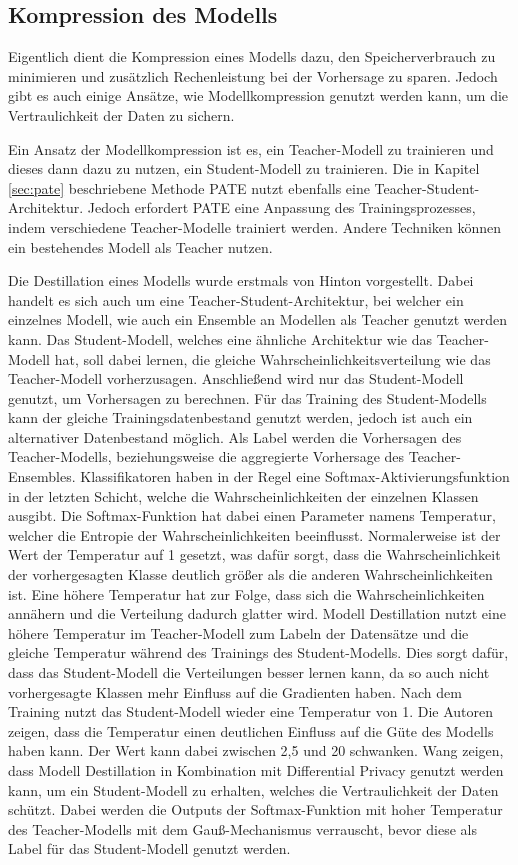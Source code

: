 \subsection{Kompression des Modells}\label{sec:kompression}

Eigentlich dient die Kompression eines Modells dazu, den Speicherverbrauch zu minimieren und zusätzlich Rechenleistung bei der Vorhersage zu sparen.
Jedoch gibt es auch einige Ansätze, wie Modellkompression genutzt werden kann, um die Vertraulichkeit der Daten zu sichern.

Ein Ansatz der Modellkompression ist es, ein Teacher-Modell zu trainieren und dieses dann dazu zu nutzen, ein Student-Modell zu trainieren. 
Die in Kapitel \ref{sec:pate} beschriebene Methode PATE nutzt ebenfalls eine Teacher-Student-Architektur. 
Jedoch erfordert PATE eine Anpassung des Trainingsprozesses, indem verschiedene Teacher-Modelle trainiert werden.
Andere Techniken können ein bestehendes Modell als Teacher nutzen.

Die Destillation eines Modells wurde erstmals von Hinton \etal \cite{P-61} vorgestellt.
Dabei handelt es sich auch um eine Teacher-Student-Architektur, bei welcher ein einzelnes Modell, wie auch ein Ensemble an Modellen als Teacher genutzt werden kann.
Das Student-Modell, welches eine ähnliche Architektur wie das Teacher-Modell hat, soll dabei lernen, die gleiche Wahrscheinlichkeitsverteilung wie das Teacher-Modell vorherzusagen.
Anschließend wird nur das Student-Modell genutzt, um Vorhersagen zu berechnen.
Für das Training des Student-Modells kann der gleiche Trainingsdatenbestand genutzt werden, jedoch ist auch ein alternativer Datenbestand möglich.
Als Label werden die Vorhersagen des Teacher-Modells, beziehungsweise die aggregierte Vorhersage des Teacher-Ensembles.
Klassifikatoren haben in der Regel eine Softmax-Aktivierungsfunktion in der letzten Schicht, welche die Wahrscheinlichkeiten der einzelnen Klassen ausgibt.
Die Softmax-Funktion hat dabei einen Parameter namens Temperatur, welcher die Entropie der Wahrscheinlichkeiten beeinflusst. 
Normalerweise ist der Wert der Temperatur auf 1 gesetzt, was dafür sorgt, dass die Wahrscheinlichkeit der vorhergesagten Klasse deutlich größer als die anderen Wahrscheinlichkeiten ist.
Eine höhere Temperatur hat zur Folge, dass sich die Wahrscheinlichkeiten annähern und die Verteilung dadurch glatter wird.
Modell Destillation nutzt eine höhere Temperatur im Teacher-Modell zum Labeln der Datensätze und die gleiche Temperatur während des Trainings des Student-Modells.
Dies sorgt dafür, dass das Student-Modell die Verteilungen besser lernen kann, da so auch nicht vorhergesagte Klassen mehr Einfluss auf die Gradienten haben.
Nach dem Training nutzt das Student-Modell wieder eine Temperatur von 1.
Die Autoren zeigen, dass die Temperatur einen deutlichen Einfluss auf die Güte des Modells haben kann. 
Der Wert kann dabei zwischen 2,5 und 20 schwanken.
Wang \etal \cite{P-64} zeigen, dass Modell Destillation in Kombination mit Differential Privacy genutzt werden kann, um ein Student-Modell zu erhalten, welches die Vertraulichkeit der Daten schützt. 
Dabei werden die Outputs der Softmax-Funktion mit hoher Temperatur des Teacher-Modells mit dem Gauß-Mechanismus verrauscht, bevor diese als Label für das Student-Modell genutzt werden.

